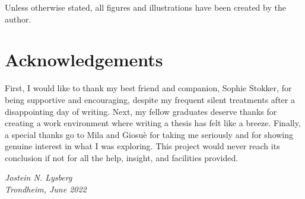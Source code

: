 
Unless otherwise stated, all figures and illustrations have been created by the author.

\section*{Acknowledgements}

First, I would like to thank my best friend and companion, Sophie Stokker, for being supportive and encouraging, despite my frequent silent treatments after a disappointing day of writing. Next, my fellow graduates deserve thanks for creating a work environment where writing a thesis has felt like a breeze. Finally, a special thanks go to Mila and Giosuè for taking me seriously and for showing genuine interest in what I was exploring. This project would never reach its conclusion if not for all the help, insight, and facilities provided. 




\hfill {\it Jostein N. Lysberg}\\[-6mm]

\hfill {\it Trondheim, June 2022}